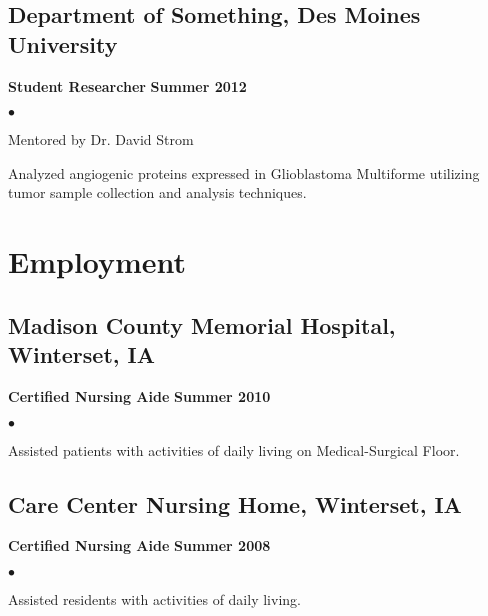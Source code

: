 \documentclass[11pt,letterpaper]{article}
\renewenvironment{itemize}{
  \begin{list}{}{
      \setlength{\leftmargin}{1.5em}
      \setlength{\itemsep}{0.25em}
      \setlength{\parskip}{0pt}
      \setlength{\parsep}{0.25em}
    }
  }{
  \end{list}
}
\newenvironment{bitemize}{
  \begin{list}{$\bullet$}{
      \setlength{\leftmargin}{1.5em}
      \setlength{\itemsep}{0.25em}
      \setlength{\parskip}{0pt}
      \setlength{\parsep}{0.25em}
    }
  }{
  \end{list}
}
\newcommand{\yearrange}[1]{\hfill \textbf{#1} \par}
\begin{document}
\subsection*{Department of Something, Des Moines University}
\begin{itemize}
\item \textbf{Student Researcher} \yearrange{Summer 2012}
  \begin{bitemize}
  \item Mentored by Dr. David Strom
  \item Analyzed angiogenic proteins expressed in Glioblastoma
    Multiforme utilizing tumor sample collection and analysis
    techniques. 
  \end{bitemize}
\end{itemize}


\section*{Employment}

\subsection*{Madison County Memorial Hospital, Winterset, IA}
\begin{itemize}
\item \textbf{Certified Nursing Aide} \yearrange{Summer 2010}
  \begin{bitemize}
    \item Assisted patients with activities of daily living on Medical-Surgical Floor.
  \end{bitemize}
\end{itemize}

\subsection*{Care Center Nursing Home, Winterset, IA}
\begin{itemize}
\item \textbf{Certified Nursing Aide} \yearrange{Summer 2008}
  \begin{bitemize}
    \item Assisted residents with activities of daily living.
  \end{bitemize}
\end{itemize}
\end{document}
